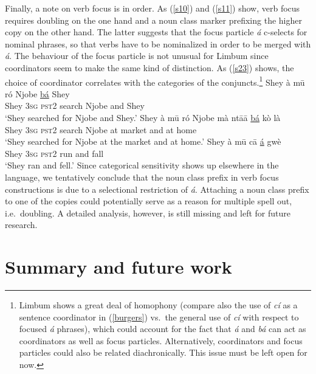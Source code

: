 \documentclass[output=paper,
modfonts
]{langscibook}
\begin{document}
Finally, a note on verb focus is in order. As (\ref{s10}) and (\ref{s11}) show, verb focus requires doubling on the one hand and a noun class marker prefixing the higher copy on the other hand. The latter suggests that the focus particle {\em \'a} c-selects for nominal phrases, so that verbs have to be nominalized in order to be merged with {\em \'a}. The behaviour of the focus particle is not unusual for Limbum since coordinators seem to make the same kind of distinction. As (\ref{s23}) shows, the choice of coordinator correlates with the categories of the conjuncts.\footnote{Limbum shows a great deal of homophony (compare also the use of {\em c\'i} as a sentence coordinator in (\ref{burgers}) vs.\ the general use of {\em c\'i} with respect to focused {\em \'a} phrases), which could account for the fact that {\em \'a} and {\em b\'a} can act as coordinators as well as focus particles. Alternatively, coordinators and focus particles could also be related diachronically. This issue must be left open for now.}
\ea \label{s23}
\ea
\gll Shey \`a m\=u r\'o Njobe \underline{b\'a} Shey \\ 
Shey \textsc{3sg} \textsc{pst2} search Njobe and Shey \\ 
\glt `Shey searched for Njobe and Shey.'
\ex
\gll Shey \`a m\=u r\'o Njobe m\`a nt\=a\=a \underline{b\'a} k\`o l\`a\textglotstop \\ 
Shey \textsc{3sg} \textsc{pst2} search Njobe at market and at home \\ 
\glt `Shey searched for Njobe at the market and at home.'
\ex
\gll Shey \`a m\=u c\=a \underline{\'a} gw\`e \\ 
Shey \textsc{3sg} \textsc{pst2} run and fall \\ 
\glt `Shey ran and fell.'
\z \z 
Since categorical sensitivity shows up elsewhere in the language, we tentatively conclude that the noun class prefix in verb focus constructions is due to a selectional restriction of {\em \'a}. Attaching a noun class prefix to one of the copies could potentially serve as a reason for multiple spell out, i.e.\ doubling. A detailed analysis, however, is still missing and left for future research.

\section{Summary and future work}
\end{document}
